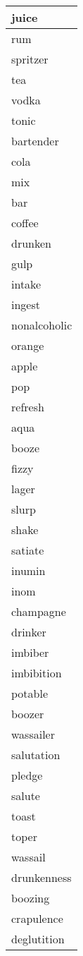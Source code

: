 \begin{longtable}{|p{3cm}|}
juice \\ \hline
rum \\ \hline
spritzer \\ \hline
tea \\ \hline
vodka \\ \hline
tonic \\ \hline
bartender \\ \hline
cola \\ \hline
mix \\ \hline
bar \\ \hline
coffee \\ \hline
drunken \\ \hline
gulp \\ \hline
intake \\ \hline
ingest \\ \hline
nonalcoholic \\ \hline
orange  \\ \hline
apple \\ \hline
pop \\ \hline
refresh \\ \hline
aqua \\ \hline
booze \\ \hline
fizzy \\ \hline
lager \\ \hline
slurp \\ \hline
shake \\ \hline
satiate \\ \hline
inumin \\ \hline
inom \\ \hline
champagne \\ \hline
drinker \\ \hline
imbiber \\ \hline
imbibition \\ \hline
potable \\ \hline
boozer \\ \hline
wassailer \\ \hline
salutation \\ \hline
pledge \\ \hline
salute \\ \hline
toast \\ \hline
toper \\ \hline
wassail \\ \hline
drunkenness \\ \hline
boozing \\ \hline
crapulence \\ \hline
deglutition \\ \hline

\end{longtable}
